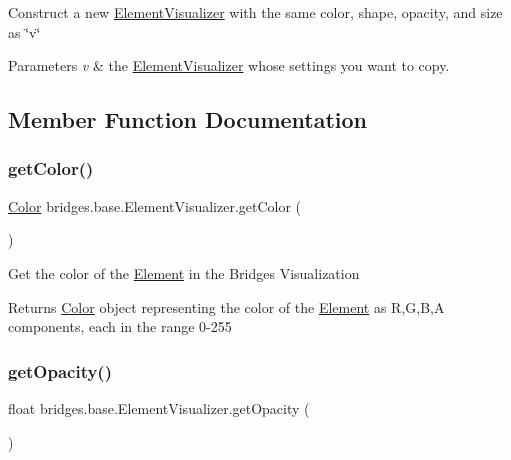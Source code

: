 Construct a new \mbox{\hyperlink{classbridges_1_1base_1_1_element_visualizer}{Element\+Visualizer}} with the same color, shape, opacity, and size as \char`\"{}v\char`\"{}


\begin{DoxyParams}{Parameters}
{\em v} & the \mbox{\hyperlink{classbridges_1_1base_1_1_element_visualizer}{Element\+Visualizer}} whose settings you want to copy. \\
\hline
\end{DoxyParams}


\subsection{Member Function Documentation}
\mbox{\label{classbridges_1_1base_1_1_element_visualizer_a3bf821b9bfa02746882bac934ce4fb8e}} 
\subsubsection{\texorpdfstring{getColor()}{getColor()}}
{\footnotesize\ttfamily \mbox{\hyperlink{classbridges_1_1base_1_1_color}{Color}} bridges.\+base.\+Element\+Visualizer.\+get\+Color (\begin{DoxyParamCaption}{ }\end{DoxyParamCaption})}

Get the color of the \mbox{\hyperlink{classbridges_1_1base_1_1_element}{Element}} in the Bridges Visualization

\begin{DoxyReturn}{Returns}
\mbox{\hyperlink{classbridges_1_1base_1_1_color}{Color}} object representing the color of the \mbox{\hyperlink{classbridges_1_1base_1_1_element}{Element}} as R,G,B,A components, each in the range 0-\/255 
\end{DoxyReturn}
\mbox{\label{classbridges_1_1base_1_1_element_visualizer_ab86ff39f17f8d1766670b18be88b5492}} 
\subsubsection{\texorpdfstring{getOpacity()}{getOpacity()}}
{\footnotesize\ttfamily float bridges.\+base.\+Element\+Visualizer.\+get\+Opacity (\begin{DoxyParamCaption}{ }\end{DoxyParamCaption})}

